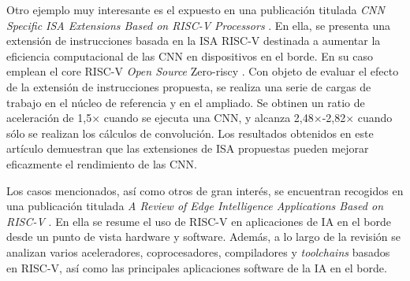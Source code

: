 Otro ejemplo muy interesante es el expuesto en una publicación titulada \textit{CNN Specific ISA Extensions Based on RISC-V Processors} \cite{9802445}.
En ella, se presenta una extensión de instrucciones basada en la ISA RISC-V destinada a aumentar la eficiencia computacional de las CNN en dispositivos en el borde. 
En su caso emplean el core RISC-V \textit{Open Source} Zero-riscy \cite{8106976} \cite{gh:zero-riscy}.
Con objeto de evaluar el efecto de la extensión de instrucciones propuesta, se realiza una serie de cargas de trabajo en el núcleo de referencia y en el ampliado. 
Se obtinen un ratio de aceleración de 1,5× cuando se ejecuta una CNN, y alcanza 2,48×-2,82× cuando sólo se realizan los cálculos de convolución. 
Los resultados obtenidos en este artículo demuestran que las extensiones de ISA propuestas pueden mejorar eficazmente el rendimiento de las CNN.

Los casos mencionados, así como otros de gran interés, se encuentran recogidos en una publicación titulada \textit{A Review of Edge Intelligence Applications Based on RISC-V} \cite{10336594}.
En ella se resume el uso de RISC-V en aplicaciones de IA en el borde desde un punto de vista hardware y software. 
Además, a lo largo de la revisión se analizan varios aceleradores, coprocesadores, compiladores y \textit{toolchains} basados en RISC-V, así como las principales aplicaciones software de la IA en el borde. 

